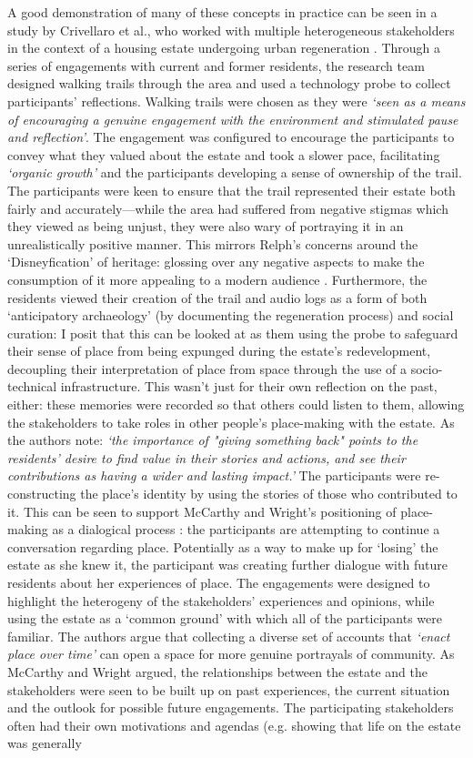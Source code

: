 A good demonstration of many of these concepts in practice can be seen in a study by Crivellaro et al., who worked with multiple heterogeneous stakeholders in the context of a housing estate undergoing urban regeneration \citep{Crivellaro2016}. Through a series of engagements with current and former residents, the research team designed walking trails through the area and used a technology probe to collect participants' reflections. Walking trails were chosen as they were \textit{`seen as a means of encouraging a genuine engagement with the environment and stimulated pause and reflection'}. The engagement was configured to encourage the participants to convey what they valued about the estate and took a slower pace, facilitating \textit{`organic growth'} and the participants developing a sense of ownership of the trail. The participants were keen to ensure that the trail represented their estate both fairly and accurately---while the area had suffered from negative stigmas which they viewed as being unjust, they were also wary of portraying it in an unrealistically positive manner. This mirrors Relph's concerns around the `Disneyfication' of heritage: glossing over any negative aspects to make the consumption of it more appealing to a modern audience \citep{Relph2018}. Furthermore, the residents viewed their creation of the trail and audio logs as a form of both `anticipatory archaeology' (by documenting the regeneration process) and social curation: I posit that this can be looked at as them using the probe to safeguard their sense of place from being expunged during the estate's redevelopment, decoupling their interpretation of place from space through the use of a socio-technical infrastructure. This wasn't just for their own reflection on the past, either: these memories were recorded so that others could listen to them, allowing the stakeholders to take roles in other people's place-making with the estate. As the authors note: \textit{`the importance of "giving something back" points to the residents' desire to find value in their stories and actions, and see their contributions as having a wider and lasting impact.'} The participants were re-constructing the place's identity by using the stories of those who contributed to it. This can be seen to support McCarthy and Wright's positioning of place-making as a dialogical process \citep{McCarthy2005}: the participants are attempting to continue a conversation regarding place. Potentially as a way to make up for `losing' the estate as she knew it, the participant was creating further dialogue with future residents about her experiences of place. The engagements were designed to highlight the heterogeny of the stakeholders' experiences and opinions, while using the estate as a `common ground' with which all of the participants were familiar. The authors argue that collecting a diverse set of accounts that \textit{`enact place over time'} can open a space for more genuine portrayals of community. As McCarthy and Wright argued, the relationships between the estate and the stakeholders were seen to be built up on past experiences, the current situation and the outlook for possible future engagements. The participating stakeholders often had their own motivations and agendas (e.g. showing that life on the estate was generally 
